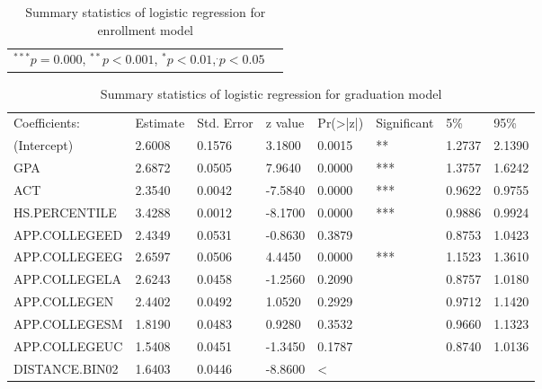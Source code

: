 \documentclass[12pt,english]{report}
\begin{document}
\begin{table}[]
\begin{adjustbox}{width=1.05\textwidth}
\begin{tabular}{lcccllcc}
\\
\hline
\multicolumn{7}{l}{\scriptsize{$^{***} p=0.000$, $^{**} p<0.001$, $^*
p<0.01$,$^{.}p<0.05$}}
\end{tabular}
\end{adjustbox}
\caption{Summary statistics of logistic regression for enrollment model}
\label{lr_summary}
\end{table}


        

\begin{table}[]
\centering
\caption{Summary statistics of logistic regression for graduation model}
\label{lr_summary2}
\begin{adjustbox}{width=1.05\textwidth}
\begin{tabular}{llllllll}
\hline
\hline
Coefficients:                   & Estimate & Std. Error & z value &
Pr(\textgreater|z|) & Significant & 5\%    & 95\%   \\
(Intercept)                     & 2.6008   & 0.1576     & 3.1800  & 0.0015     
& **          & 1.2737 & 2.1390 \\
GPA                             & 2.6872   & 0.0505     & 7.9640  & 0.0000     
& ***         & 1.3757 & 1.6242 \\
ACT                             & 2.3540   & 0.0042     & -7.5840 & 0.0000     
& ***         & 0.9622 & 0.9755 \\
HS.PERCENTILE                   & 3.4288   & 0.0012     & -8.1700 & 0.0000     
& ***         & 0.9886 & 0.9924 \\
APP.COLLEGEED                   & 2.4349   & 0.0531     & -0.8630 & 0.3879     
&             & 0.8753 & 1.0423 \\
APP.COLLEGEEG                   & 2.6597   & 0.0506     & 4.4450  & 0.0000     
& ***         & 1.1523 & 1.3610 \\
APP.COLLEGELA                   & 2.6243   & 0.0458     & -1.2560 & 0.2090     
&             & 0.8757 & 1.0180 \\
APP.COLLEGEN                    & 2.4402   & 0.0492     & 1.0520  & 0.2929     
&             & 0.9712 & 1.1420 \\
APP.COLLEGESM                   & 1.8190   & 0.0483     & 0.9280  & 0.3532     
&             & 0.9660 & 1.1323 \\
APP.COLLEGEUC                   & 1.5408   & 0.0451     & -1.3450 & 0.1787     
&             & 0.8740 & 1.0136 \\
DISTANCE.BIN02                  & 1.6403   & 0.0446     & -8.8600 & \textless

\end{tabular}
\end{adjustbox}
\end{table}
\end{document}
